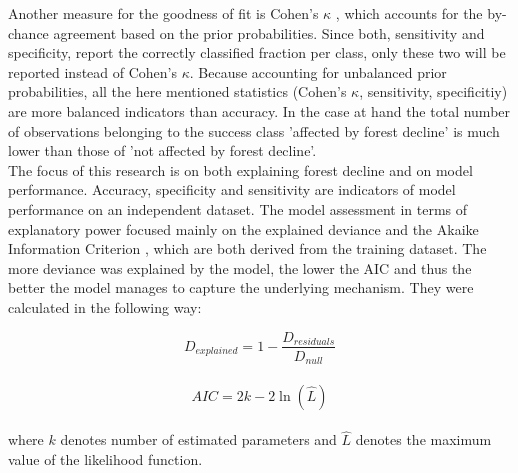 Another measure for the goodness of fit is Cohen's $\kappa$ \citep{cohen1960}, which accounts for the by-chance agreement based on the prior probabilities. Since both, sensitivity and specificity, report the correctly classified fraction per class, only these two will be reported instead of Cohen's $\kappa$. Because accounting for unbalanced prior probabilities, all the here mentioned statistics (Cohen's $\kappa$, sensitivity, specificitiy) are more balanced indicators than accuracy. In the case at hand the total number of observations belonging to the success class 'affected by forest decline' is much lower than those of 'not affected by forest decline'.\\
The focus of this research is on both explaining forest decline and on model performance. Accuracy, specificity and sensitivity are indicators of model performance on an independent dataset. The model assessment in terms of explanatory power focused mainly on the explained deviance and the Akaike Information Criterion \citep[AIC after][]{akaike1973}, which are both derived from the training dataset. The more deviance was explained by the model, the lower the AIC and thus the better the model manages to capture the underlying mechanism. They were calculated in the following way:

\begin{equation}\label{eq:devExpl}
	D_{explained} = 1 - \frac{D_{residuals}}{D_{null}}
\end{equation}\\

\begin{equation}\label{eq:aic}
	AIC = 2k - 2 \ln(\hat{L})
\end{equation}\\
where $k$ denotes number of estimated parameters and $\hat{L}$ denotes the maximum value of the likelihood function.\\



